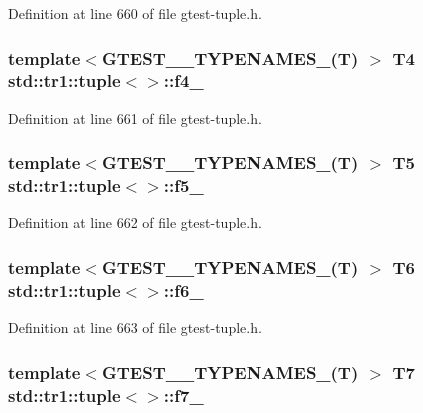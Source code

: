 Definition at line 660 of file gtest-\/tuple.\+h.

\subsubsection[{\texorpdfstring{f4\+\_\+}{f4_}}]{\setlength{\rightskip}{0pt plus 5cm}template$<$G\+T\+E\+S\+T\+\_\+\_\+\+T\+Y\+P\+E\+N\+A\+M\+E\+S\+\_\+(\+T) $>$ T4 {\bf std\+::tr1\+::tuple}$<$$>$\+::f4\+\_\+}\hypertarget{classstd_1_1tr1_1_1tuple_ab662f1051c2302d065796383848db6c4}{}\label{classstd_1_1tr1_1_1tuple_ab662f1051c2302d065796383848db6c4}


Definition at line 661 of file gtest-\/tuple.\+h.

\subsubsection[{\texorpdfstring{f5\+\_\+}{f5_}}]{\setlength{\rightskip}{0pt plus 5cm}template$<$G\+T\+E\+S\+T\+\_\+\_\+\+T\+Y\+P\+E\+N\+A\+M\+E\+S\+\_\+(\+T) $>$ T5 {\bf std\+::tr1\+::tuple}$<$$>$\+::f5\+\_\+}\hypertarget{classstd_1_1tr1_1_1tuple_a32d8cd6f180c0a77d83733fc65423657}{}\label{classstd_1_1tr1_1_1tuple_a32d8cd6f180c0a77d83733fc65423657}


Definition at line 662 of file gtest-\/tuple.\+h.

\subsubsection[{\texorpdfstring{f6\+\_\+}{f6_}}]{\setlength{\rightskip}{0pt plus 5cm}template$<$G\+T\+E\+S\+T\+\_\+\_\+\+T\+Y\+P\+E\+N\+A\+M\+E\+S\+\_\+(\+T) $>$ T6 {\bf std\+::tr1\+::tuple}$<$$>$\+::f6\+\_\+}\hypertarget{classstd_1_1tr1_1_1tuple_a597beab3af3f95c84408491ab14632b0}{}\label{classstd_1_1tr1_1_1tuple_a597beab3af3f95c84408491ab14632b0}


Definition at line 663 of file gtest-\/tuple.\+h.

\subsubsection[{\texorpdfstring{f7\+\_\+}{f7_}}]{\setlength{\rightskip}{0pt plus 5cm}template$<$G\+T\+E\+S\+T\+\_\+\_\+\+T\+Y\+P\+E\+N\+A\+M\+E\+S\+\_\+(\+T) $>$ T7 {\bf std\+::tr1\+::tuple}$<$$>$\+::f7\+\_\+}\hypertarget{classstd_1_1tr1_1_1tuple_a7c28780e616d382833e844f62672c6bc}{}\label{classstd_1_1tr1_1_1tuple_a7c28780e616d382833e844f62672c6bc}


